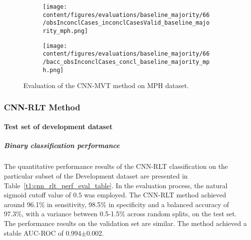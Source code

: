 \begin{figure}[ht]
  \begin{subfigure}{0.49\textwidth}
    \centering
    \texttt{[image: content/figures/evaluations/baseline\_majority/66/obsInconclCases\_inconclCasesValid\_baseline\_majority\_mph.png]}
    \label{fig:obsInconclCases_inconclCasesValid_baseline_majority_mph}
  \end{subfigure}
  \hfill
  \begin{subfigure}{0.49\textwidth}
    \centering
    \texttt{[image: content/figures/evaluations/baseline\_majority/66/bacc\_obsInconclCases\_concl\_baseline\_majority\_mph.png]}
    \label{fig:bacc_obsInconclCases_concl_baseline_majority_mph}
  \end{subfigure}
  \caption{Evaluation of the CNN-MVT method on MPH dataset.}
  \label{fig:perf_results_mvt_mph}
\end{figure}


\subsubsection{CNN-RLT Method}
\label{subsubsec:eval_rlt}


\paragraph{Test set of development dataset}


\subparagraph{Binary classification performance}

The quantitative performance results of the CNN-RLT classification on the 
particular subset of the Development dataset are presented in Table~\ref{t1:cnn_rlt_perf_eval_table}.
In the evaluation process, the natural sigmoid cutoff value of $0.5$ was employed.
The CNN-RLT method achieved around 96.1\% in sensitivity, 98.5\% in specificity and a balanced accuracy of 97.3\%, 
with a variance between 0.5-1.5\% across random splits, on the test set.
The performance results on the validation set are similar.
The method achieved a stable AUC-ROC of 0.994$\pm$0.002.


